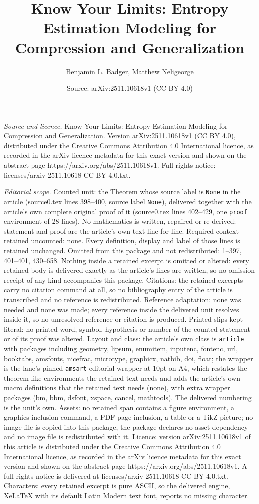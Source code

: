 \documentclass[10pt,a4paper]{amsart}
\title[Know Your Limits: Entropy Estimation Modeling for Compressio]{Know Your Limits: Entropy Estimation Modeling for Compression and Generalization}
\author{Benjamin L. Badger, Matthew Neligeorge}
\date{Source: arXiv:2511.10618v1 (CC BY 4.0)}
\begin{document}
\maketitle

\noindent\emph{Source and licence.} Know Your Limits: Entropy Estimation Modeling for Compression and Generalization. Version arXiv:2511.10618v1 (CC BY 4.0), distributed under the Creative Commons Attribution 4.0 International licence, as recorded in the arXiv licence metadata for this exact version and shown on the abstract page https://arxiv.org/abs/2511.10618v1. Full rights notice: licenses/arxiv-2511.10618-CC-BY-4.0.txt.\par\smallskip

\noindent\textit{Editorial scope.} Counted unit: the Theorem whose source label is \texttt{None} in the article (source0.tex lines 398--400, source label \texttt{None}), delivered together with the article's own complete original proof of it (source0.tex lines 402--429, one \texttt{proof} environment of 28 lines). No mathematics is written, repaired or re-derived: statement and proof are the article's own text line for line. Required context retained uncounted: none. Every definition, display and label of those lines is retained unchanged. Omitted from this package and not redistributed: 1--397, 401--401, 430--658. Nothing inside a retained excerpt is omitted or altered: every retained body is delivered exactly as the article's lines are written, so no omission receipt of any kind accompanies this package. Citations: the retained excerpts carry no citation command at all, so no bibliography entry of the article is transcribed and no reference is redistributed. Reference adaptation: none was needed and none was made; every reference inside the delivered unit resolves inside it, so no unresolved reference or citation is produced. Printed slips kept literal: no printed word, symbol, hypothesis or number of the counted statement or of its proof was altered. Layout and class: the article's own class is \texttt{article} with packages including geometry, lipsum, enumitem, inputenc, fontenc, url, booktabs, amsfonts, nicefrac, microtype, graphicx, natbib, doi, float; the wrapper is the lane's pinned \texttt{amsart} editorial wrapper at 10pt on A4, which restates the theorem-like environments the retained text needs and adds the article's own macro definitions that the retained text needs (none), with extra wrapper packages (bm, bbm, dsfont, xspace, cancel, mathtools). The delivered numbering is the unit's own. Assets: no retained span contains a figure environment, a graphics-inclusion command, a PDF-page inclusion, a table or a TikZ picture; no image file is copied into this package, the package declares no asset dependency and no image file is redistributed with it. Licence: version arXiv:2511.10618v1 of this article is distributed under the Creative Commons Attribution 4.0 International licence, as recorded in the arXiv licence metadata for this exact version and shown on the abstract page https://arxiv.org/abs/2511.10618v1. A full rights notice is delivered at licenses/arxiv-2511.10618-CC-BY-4.0.txt. Characters: every retained excerpt is pure ASCII, so the delivered engine, XeLaTeX with its default Latin Modern text font, reports no missing character.
\end{document}
